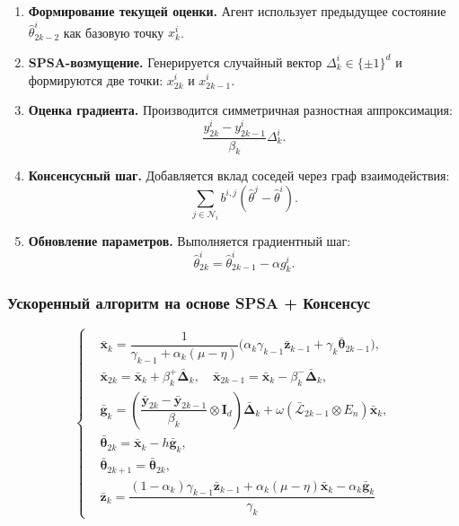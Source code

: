 \begin{enumerate}
    \item \textbf{Формирование текущей оценки.}  
    Агент использует предыдущее состояние $\hat{\theta}_{2k-2}^i$ как базовую точку $x_k^i$.

    \item \textbf{SPSA-возмущение.}  
    Генерируется случайный вектор $\Delta_k^i \in \{\pm 1\}^d$ и формируются две точки:
    $x_{2k}^i$ и $x_{2k-1}^i$.

    \item \textbf{Оценка градиента.}  
    Производится симметричная разностная аппроксимация:
    \[
    \frac{y_{2k}^i - y_{2k-1}^i}{\beta_k}\Delta_k^i.
    \]

    \item \textbf{Консенсусный шаг.}  
    Добавляется вклад соседей через граф взаимодействия:
    \[
    \sum_{j \in \mathcal{N}_i} b^{i,j} (\hat{\theta}^j - \hat{\theta}^i).
    \]

    \item \textbf{Обновление параметров.}  
    Выполняется градиентный шаг:
    \[
    \hat{\theta}_{2k}^i = \hat{\theta}_{2k-1}^i - \alpha g_k^i.
    \]
\end{enumerate}

\subsubsection{Ускоренный алгоритм на основе SPSA + Консенсус}


\[
\left\{
\begin{aligned}
  &\bar{\mathbf{x}}_k = \dfrac{1}{\gamma_{k-1} + \alpha_k(\mu - \eta)} \Big( \alpha_k \gamma_{k-1} \bar{\mathbf{z}}_{k-1} + \gamma_k \bar{\boldsymbol{\theta}}_{2k-1} \Big), \\[0.8em]
  &\bar{\mathbf{x}}_{2k} = \bar{\mathbf{x}}_k + \beta_k^+ \bar{\boldsymbol{\Delta}}_k, \quad
  \bar{\mathbf{x}}_{2k-1} = \bar{\mathbf{x}}_k - \beta_k^- \bar{\boldsymbol{\Delta}}_k, \\[0.8em]
  &\bar{\mathbf{g}}_k = \left( \dfrac{\bar{\mathbf{y}}_{2k} - \bar{\mathbf{y}}_{2k-1}}{\beta_k} \otimes \mathbf{I}_d \right) \bar{\boldsymbol{\Delta}}_k + \omega \left( \bar{\mathcal{L}}_{2k-1} \otimes E_n \right) \bar{\mathbf{x}}_k, \\[0.8em]
  &\bar{\boldsymbol{\theta}}_{2k} = \bar{\mathbf{x}}_k - h \bar{\mathbf{g}}_k, \\[0.5em]
  &\bar{\boldsymbol{\theta}}_{2k+1} = \bar{\boldsymbol{\theta}}_{2k}, \\[0.5em]
  &\bar{\mathbf{z}}_k = \dfrac{(1 - \alpha_k) \gamma_{k-1} \bar{\mathbf{z}}_{k-1} + \alpha_k (\mu - \eta) \bar{\mathbf{x}}_k - \alpha_k \bar{\mathbf{g}}_k}{\gamma_k}
\end{aligned}
\right.
\]

